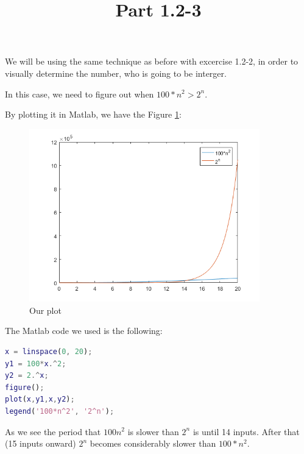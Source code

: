 \documentclass{article}
\title{Part 1.2-3}
\begin{document}
\date{}
\author{}

\maketitle

We will be using the same technique as before with excercise 1.2-2, in order to visually determine the number, who is going to be interger.

In this case, we need to figure out when $ 100*n^{2} > 2^{n} $.

By plotting it in Matlab, we have the Figure \ref{fig:plot1}:

\begin{figure}
    \includegraphics[width=10cm]{images/1-2-3.png}
    \centering
    \caption{Our plot}
    \label{fig:plot1}
\end{figure}

The Matlab code we used is the following:

\begin{lstlisting}[language=Matlab]
x = linspace(0, 20);
y1 = 100*x.^2;
y2 = 2.^x;
figure();
plot(x,y1,x,y2);
legend('100*n^2', '2^n');
\end{lstlisting}

As we see the period that $100n^{2}$ is slower than $2^{n}$ is until 14 inputs. After that (15 inputs onward) $2^{n}$ becomes considerably slower than $100*n^{2}$.
\end{document}
